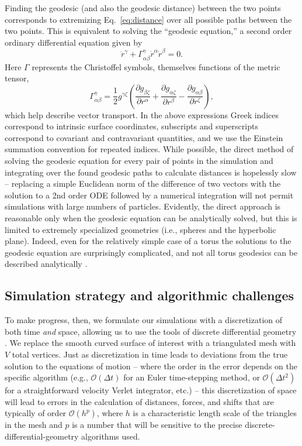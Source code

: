 \documentclass[preprint,12pt]{elsarticle}
\begin{document}
Finding the geodesic (and also the geodesic distance) between the two points corresponds to extremizing Eq.~\ref{eq:distance} over all possible paths between the two points. This is equivalent to solving the ``geodesic equation,'' a second order ordinary differential
equation given by
\begin{equation}\label{eq:geoeq}
    \ddot{r}^\gamma + \Gamma_{\alpha\beta}^{\gamma}\dot{r}^\alpha \dot{r}^\beta = 0.
\end{equation}
Here $\Gamma$ represents the Christoffel symbols, themselves functions of the metric tensor,
\begin{equation}
\Gamma_{\alpha\beta}^{\gamma} = \frac{1}{2}g^{\gamma\zeta}\left(\frac{\partial g_{\beta\zeta}}{\partial r^\alpha} +\frac{\partial g_{\alpha\zeta}}{\partial r^\beta}-\frac{\partial g_{\alpha\beta}}{\partial r^\zeta}\right), 
\end{equation}
which help describe vector transport. In the above expressions Greek indices correspond to intrinsic surface coordinates, subscripts and superscripts correspond to covariant and contravariant quantities, and we use the Einstein summation convention for repeated indices.
While possible, the direct method of solving the geodesic equation for every pair of points in the simulation and integrating over the found geodesic paths to calculate distances is hopelessly slow -- replacing a simple Euclidean norm of the difference of two vectors with the solution to a 2nd order ODE followed by a numerical integration will not permit simulations with large numbers of particles. Evidently, the direct approach is reasonable only when the geodesic equation can be analytically solved, but this is limited to extremely specialized geometries (i.e., spheres and the hyperbolic plane). Indeed, even for the relatively  simple case of a torus the solutions to the geodesic equation are surprisingly complicated, and not all torus geodesics can be described analytically \cite{jantzen2012geodesics}. 

\subsection{Simulation strategy and algorithmic challenges}

To make progress, then, we formulate our simulations with a discretization of both time \emph{and} space, allowing us to use the tools of discrete differential geometry \cite{crane2018discrete}. We replace the smooth curved surface of interest with a triangulated mesh with $V$ total vertices. Just as discretization in time leads to deviations from the true solution to the equations of motion -- where the order in the error depends on the specific algorithm (e.g., $\mathcal{O}(\Delta t)$ for an Euler time-stepping method, or $\mathcal{O}(\Delta t^2)$ for a straightforward velocity  Verlet integrator, etc.) -- this discretization of space will lead to errors in the calculation of distances, forces, and shifts that are typically  of order $\mathcal{O}(h^p)$, where $h$ is a characteristic length scale of the triangles in the mesh and $p$ is a number that will be sensitive to the precise discrete-differential-geometry algorithms used. 
\end{document}

